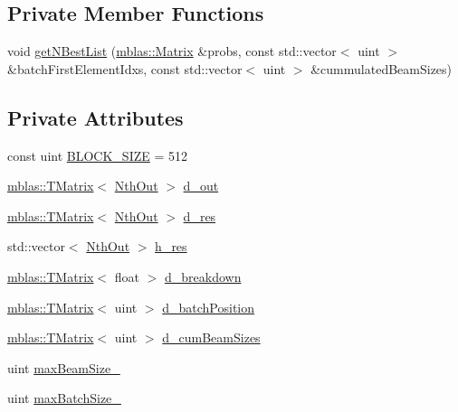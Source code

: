 \subsection*{Private Member Functions}
\begin{DoxyCompactItemize}
\item 
void \hyperlink{classamunmt_1_1GPU_1_1NthElement_a89c467a1af86daa2407335b71dcae372}{get\+N\+Best\+List} (\hyperlink{namespaceamunmt_1_1GPU_1_1mblas_ab67821a8254de53e45a623cf73c0aef6}{mblas\+::\+Matrix} \&probs, const std\+::vector$<$ uint $>$ \&batch\+First\+Element\+Idxs, const std\+::vector$<$ uint $>$ \&cummulated\+Beam\+Sizes)
\end{DoxyCompactItemize}
\subsection*{Private Attributes}
\begin{DoxyCompactItemize}
\item 
const uint \hyperlink{classamunmt_1_1GPU_1_1NthElement_a1f8b1479cf23b5b8aa9f703286e963c2}{B\+L\+O\+C\+K\+\_\+\+S\+I\+ZE} = 512
\item 
\hyperlink{classamunmt_1_1GPU_1_1mblas_1_1TMatrix}{mblas\+::\+T\+Matrix}$<$ \hyperlink{structamunmt_1_1GPU_1_1NthOut}{Nth\+Out} $>$ \hyperlink{classamunmt_1_1GPU_1_1NthElement_a548c267a24a0bb08c0e1404f686bb436}{d\+\_\+out}
\item 
\hyperlink{classamunmt_1_1GPU_1_1mblas_1_1TMatrix}{mblas\+::\+T\+Matrix}$<$ \hyperlink{structamunmt_1_1GPU_1_1NthOut}{Nth\+Out} $>$ \hyperlink{classamunmt_1_1GPU_1_1NthElement_a0a062223b34ac2de666f65bb66c1a8ba}{d\+\_\+res}
\item 
std\+::vector$<$ \hyperlink{structamunmt_1_1GPU_1_1NthOut}{Nth\+Out} $>$ \hyperlink{classamunmt_1_1GPU_1_1NthElement_ab23b653e994f5b6a24bcb12aa8afc1e7}{h\+\_\+res}
\item 
\hyperlink{classamunmt_1_1GPU_1_1mblas_1_1TMatrix}{mblas\+::\+T\+Matrix}$<$ float $>$ \hyperlink{classamunmt_1_1GPU_1_1NthElement_a43e7096145399135e2142662f09e763a}{d\+\_\+breakdown}
\item 
\hyperlink{classamunmt_1_1GPU_1_1mblas_1_1TMatrix}{mblas\+::\+T\+Matrix}$<$ uint $>$ \hyperlink{classamunmt_1_1GPU_1_1NthElement_ac2ca8b0b8656e32630331bf9b805b6bd}{d\+\_\+batch\+Position}
\item 
\hyperlink{classamunmt_1_1GPU_1_1mblas_1_1TMatrix}{mblas\+::\+T\+Matrix}$<$ uint $>$ \hyperlink{classamunmt_1_1GPU_1_1NthElement_adc21c425caa1181bf05b06b475dafc10}{d\+\_\+cum\+Beam\+Sizes}
\item 
uint \hyperlink{classamunmt_1_1GPU_1_1NthElement_a86e18f1731eb39119d07d2f1b6692dca}{max\+Beam\+Size\+\_\+}
\item 
uint \hyperlink{classamunmt_1_1GPU_1_1NthElement_a86641a85c4e1c28d3e4776640a10187f}{max\+Batch\+Size\+\_\+}
\end{DoxyCompactItemize}


